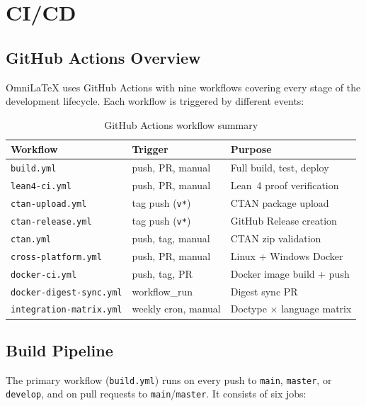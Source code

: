 \chapter{CI/CD}
\label{ch:ci-cd}

\section{GitHub Actions Overview}

OmniLaTeX uses GitHub Actions with nine workflows covering every stage of the
development lifecycle.  Each workflow is triggered by different events:

\begin{table}[htbp]
  \centering
  \begin{tabular}{@{} l l l @{}}
    \toprule
    \textbf{Workflow} & \textbf{Trigger} & \textbf{Purpose} \\
    \midrule
    \texttt{build.yml} & push, PR, manual & Full build, test, deploy \\
    \texttt{lean4-ci.yml} & push, PR, manual & Lean~4 proof verification \\
    \texttt{ctan-upload.yml} & tag push (\texttt{v*}) & CTAN package upload \\
    \texttt{ctan-release.yml} & tag push (\texttt{v*}) & GitHub Release creation \\
    \texttt{ctan.yml} & push, tag, manual & CTAN zip validation \\
    \texttt{cross-platform.yml} & push, PR, manual & Linux + Windows Docker \\
    \texttt{docker-ci.yml} & push, tag, PR & Docker image build + push \\
    \texttt{docker-digest-sync.yml} & workflow\_run & Digest sync PR \\
    \texttt{integration-matrix.yml} & weekly cron, manual & Doctype $\times$ language matrix \\
    \bottomrule
  \end{tabular}
  \caption{GitHub Actions workflow summary}
\end{table}

\section{Build Pipeline}

The primary workflow (\texttt{build.yml}) runs on every push to
\texttt{main}, \texttt{master}, or \texttt{develop}, and on pull requests
to \texttt{main}/\texttt{master}.  It consists of six jobs:

